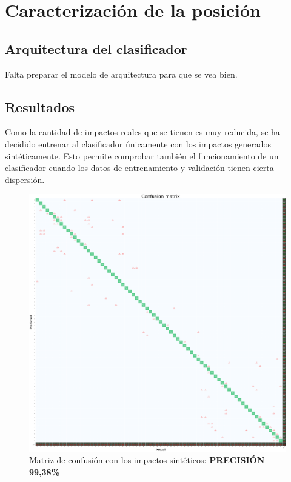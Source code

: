 

\section{Caracterización de la posición}

\subsection{Arquitectura del clasificador}

Falta preparar el modelo de arquitectura para que se vea bien.




\subsection{Resultados}

Como la cantidad de impactos reales que se tienen es muy reducida, se ha decidido entrenar al clasificador únicamente con los impactos generados sintéticamente. Esto permite comprobar también el funcionamiento de un clasificador cuando los datos de entrenamiento y validación tienen cierta dispersión.\\

\begin{figure}[H]
    \centering
    \includegraphics[width=150mm, angle=0]{4/Fotos/CM_A380_Sintetico.png}
    \captionsetup{justification=centering,margin=1.25cm}
    \caption{Matriz de confusión con los impactos sintéticos: \textbf{PRECISIÓN 99,38\%}}
    \label{fig:CM_Real}
\end{figure}

